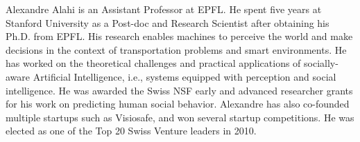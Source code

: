 \documentclass[journal]{IEEEtran}
\begin{document}
\begin{IEEEbiography}{Alexandre Alahi}
  is an Assistant Professor at EPFL. He spent five years at Stanford
  University as a Post-doc and Research Scientist after obtaining his Ph.D.
  from EPFL. His research enables machines to perceive the world and make
  decisions in the context of transportation problems and smart environments.
  He has worked on the theoretical challenges and practical applications of
  socially-aware Artificial Intelligence, i.e., systems equipped with
  perception and social intelligence. He was awarded the Swiss NSF early and
  advanced researcher grants for his work on predicting human social
  behavior. Alexandre has also co-founded multiple startups such as
  Visiosafe, and won several startup competitions. He was elected as one of
  the Top 20 Swiss Venture leaders in 2010.
\end{IEEEbiography}



\vfill
\end{document}
